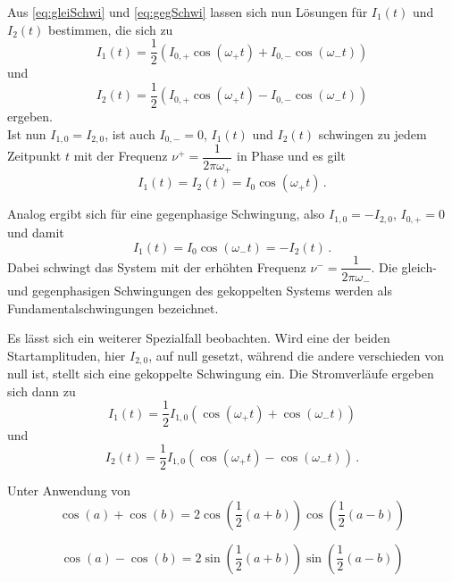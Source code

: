 Aus \eqref{eq:gleiSchwi} und \eqref{eq:gegSchwi} lassen sich nun Lösungen für $I_1(t)$ und $I_2(t)$ bestimmen, die sich zu
\begin{equation}
    I_1(t) = \dfrac{1}{2}(I_{0,+}\cos(ω_+ t) + I_{0,-}\cos(ω_- t))
\end{equation}
und
\begin{equation}
    I_2(t) = \dfrac{1}{2}(I_{0,+}\cos(ω_+ t) - I_{0,-}\cos(ω_- t))
\end{equation}
ergeben. \\

Ist nun $I_{1,0} = I_{2,0}$, ist auch $I_{0,-} = 0$, $I_1(t)$ und $I_2(t)$ schwingen zu jedem Zeitpunkt $t$ mit der Frequenz $ν^+ = \dfrac{1}{2πω_+}$ in Phase und es gilt
\begin{equation*}
     I_1(t) = I_2(t) = I_0 \cos(ω_+ t)\,.
\end{equation*}

Analog ergibt sich für eine gegenphasige Schwingung, also $I_{1,0} = -I_{2,0}$, $I_{0,+}=0$ und damit
\begin{equation*}
    I_1(t) = I_0 \cos(ω_- t) = -I_2(t)\,.
\end{equation*}
Dabei schwingt das System mit der erhöhten Frequenz $ν^- = \dfrac{1}{2πω_-}$. Die gleich- und gegenphasigen Schwingungen des gekoppelten Systems werden als Fundamentalschwingungen bezeichnet.

Es lässt sich ein weiterer Spezialfall beobachten. Wird eine der beiden Startamplituden, hier $I_{2,0}$, auf null gesetzt, während die andere verschieden von null ist, stellt sich eine gekoppelte Schwingung ein.
Die Stromverläufe ergeben sich dann zu
\begin{equation}
    I_1(t) = \dfrac{1}{2} I_{1,0}(\cos(ω_+ t) + \cos(ω_- t))
    \label{eq:gekoSchwi1}
\end{equation}
und
\begin{equation}
    I_2(t) = \dfrac{1}{2} I_{1,0}(\cos(ω_+ t) - \cos(ω_- t))\,.
    \label{eq:gekoSchwi2}
\end{equation}

Unter Anwendung von
\begin{equation*}
    \cos(a) + \cos(b) = 2 \cos(\dfrac{1}{2}(a+b)) \cos(\dfrac{1}{2}(a-b))
\end{equation*} 

\begin{equation*}
    \cos(a) - \cos(b) = 2 \sin(\dfrac{1}{2}(a+b)) \sin(\dfrac{1}{2}(a-b))
\end{equation*} 

